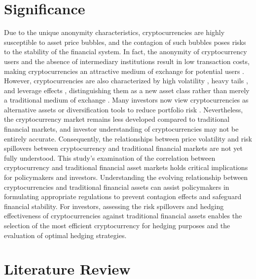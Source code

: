 \documentclass{article}
\begin{document}
\section{Significance}
Due to the unique anonymity characteristics, cryptocurrencies are highly susceptible to asset price bubbles, and the contagion of such bubbles poses risks to the stability of the financial system. In fact, the anonymity of cryptocurrency users and the absence of intermediary institutions result in low transaction costs, making cryptocurrencies an attractive medium of exchange for potential users \cite{baur2018b}. However, cryptocurrencies are also characterized by high volatility \cite{chu2017,katsiampa2017}, heavy tails \cite{osterrieder2017,gkillas2018,phillip2018}, and leverage effects \cite{phillip2018}, distinguishing them as a new asset class rather than merely a traditional medium of exchange \cite{yermack2015,baek2015,dyhrberg2016b}. Many investors now view cryptocurrencies as alternative assets or diversification tools to reduce portfolio risk \cite{tiwari2019}. Nevertheless, the cryptocurrency market remains less developed compared to traditional financial markets, and investor understanding of cryptocurrencies may not be entirely accurate. Consequently, the relationships between price volatility and risk spillovers between cryptocurrency and traditional financial markets are not yet fully understood.
This study’s examination of the correlation between cryptocurrency and traditional financial asset markets holds critical implications for policymakers and investors. Understanding the evolving relationship between cryptocurrencies and traditional financial assets can assist policymakers in formulating appropriate regulations to prevent contagion effects and safeguard financial stability. For investors, assessing the risk spillovers and hedging effectiveness of cryptocurrencies against traditional financial assets enables the selection of the most efficient cryptocurrency for hedging purposes and the evaluation of optimal hedging strategies.

\section{Literature Review}
\end{document}
